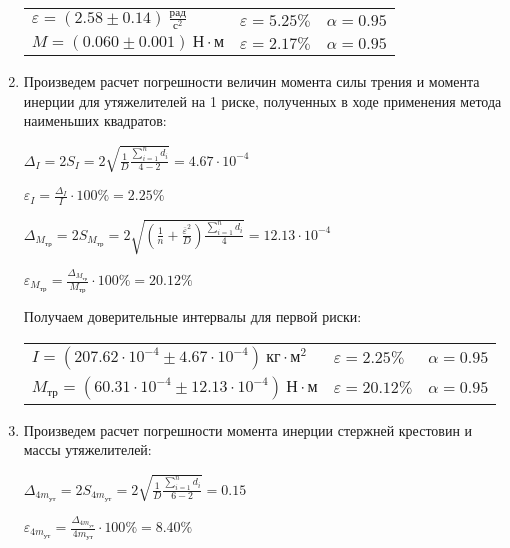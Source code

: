 \begin{enumerate}
\begin{tabular}{lll}
        $\varepsilon = (2.58 \pm 0.14) \ \frac{\text{рад}}{\text{с}^2}$ & $\varepsilon = 5.25\%$ & $\alpha = 0.95$ \\

        $M = (0.060 \pm 0.001) \ \text{Н} \cdot \text{м}$ & $\varepsilon = 2.17\%$ & $\alpha = 0.95$ \\
    \end{tabular}

    \smallvspace

    \item Произведем расчет погрешности величин момента силы трения и момента инерции для утяжелителей на 1 риске, 
    полученных в ходе применения метода наименьших квадратов:

    $\displaystyle \Delta_I = 2 S_I = 2\sqrt{\frac{1}{D} \frac{\sum_{i = 1}^n d_i}{4 - 2}} = 4.67 \cdot 10^{-4}$

    $\displaystyle \varepsilon_I = \frac{\Delta_I}{I} \cdot 100\% = 2.25\%$

    $\displaystyle \Delta_{M_\text{тр}} = 2S_{M_\text{тр}} = 2\sqrt{\left(\frac{1}{n} + \frac{\overline{\varepsilon}^2}{D}\right) \frac{\sum_{i = 1}^n d_i}{4}} = 12.13 \cdot 10^{-4}$

    $\displaystyle \varepsilon_{M_\text{тр}} = \frac{\Delta_{M_\text{тр}}}{{M_\text{тр}}} \cdot 100\% = 20.12\%$

    Получаем доверительные интервалы для первой риски:

    \begin{tabular}{lll}
        $I = (207.62 \cdot 10^{-4} \pm 4.67 \cdot 10^{-4}) \ \text{кг} \cdot \text{м}^2$ & $\varepsilon = 2.25\%$ & $\alpha = 0.95$ \\

        $M_\text{тр} = (60.31 \cdot 10^{-4} \pm 12.13 \cdot 10^{-4}) \ \text{Н} \cdot \text{м}$ & $\varepsilon = 20.12\%$ & $\alpha = 0.95$ \\
    \end{tabular}

    \smallvspace

    \item Произведем расчет погрешности момента инерции стержней крестовин и массы утяжелителей:

    $\displaystyle \Delta_{4m_\text{ут}} = 2 S_{4m_\text{ут}} = 2\sqrt{\frac{1}{D} \frac{\sum_{i = 1}^n d_i}{6 - 2}} = 0.15$

    $\displaystyle \varepsilon_{4m_\text{ут}} = \frac{\Delta_{4m_\text{ут}}}{4m_\text{ут}} \cdot 100\% = 8.40\%$


\end{enumerate}

